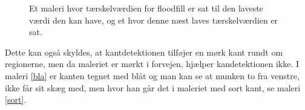 \begin{figure}[!h]
    \centering
     \caption{Et maleri hvor tærskelværdien for floodfill er sat til den laveste værdi den kan have, og et hvor denne næst laves tærskelværdien er sat.}
     \label{ff_munke}
\end{figure}

Dette kan også skyldes, at kantdetektionen tilføjer en mørk kant rundt
om regionerne, men da maleriet er mørkt i forvejen, hjælper
kandetektionen ikke. I maleri \ref{bla} er kanten tegnet med blåt og man
kan se at munken to fra venstre, ikke får sit skæg med, men hvor han går
det i maleriet med sort kant, se maleri \ref{sort}.

